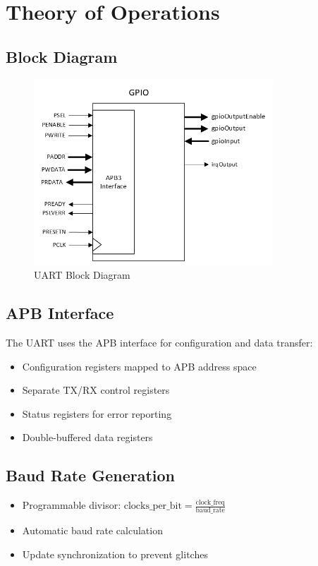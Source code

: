 \section{Theory of Operations}
\subsection{Block Diagram}
\begin{figure}[h]
  \includegraphics[width=0.80\textwidth]{images/uart-block-diagram.png}
  \caption{UART Block Diagram}\label{fig:block-diagram}
\end{figure}

\subsection{APB Interface}
The UART uses the APB interface for configuration and data transfer:
\begin{itemize}
  \item Configuration registers mapped to APB address space
  \item Separate TX/RX control registers
  \item Status registers for error reporting
  \item Double-buffered data registers
\end{itemize}

\subsection{Baud Rate Generation}
\begin{itemize}
  \item Programmable divisor: $\text{clocks\_per\_bit} = \frac{\text{clock\_freq}}{\text{baud\_rate}}$
  \item Automatic baud rate calculation
  \item Update synchronization to prevent glitches
\end{itemize}

